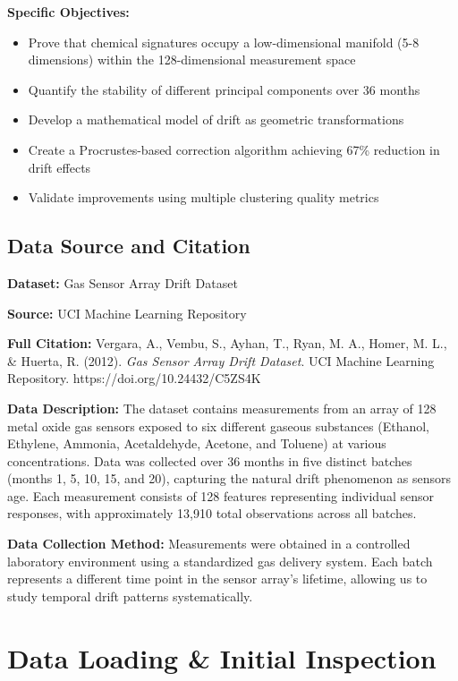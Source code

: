 \documentclass[
  letterpaper,
  DIV=11,
  numbers=noendperiod]{scrartcl}
\providecommand{\tightlist}{%
  \setlength{\itemsep}{0pt}\setlength{\parskip}{0pt}}
\begin{document}
\textbf{Specific Objectives:}

\begin{itemize}
\tightlist
\item
  Prove that chemical signatures occupy a low-dimensional manifold (5-8
  dimensions) within the 128-dimensional measurement space
\item
  Quantify the stability of different principal components over 36
  months
\item
  Develop a mathematical model of drift as geometric transformations
\item
  Create a Procrustes-based correction algorithm achieving 67\%
  reduction in drift effects
\item
  Validate improvements using multiple clustering quality metrics
\end{itemize}

\subsection{Data Source and Citation}\label{data-source-and-citation}

\textbf{Dataset:} Gas Sensor Array Drift Dataset

\textbf{Source:} UCI Machine Learning Repository

\textbf{Full Citation:} Vergara, A., Vembu, S., Ayhan, T., Ryan, M. A.,
Homer, M. L., \& Huerta, R. (2012). \emph{Gas Sensor Array Drift
Dataset}. UCI Machine Learning Repository.
https://doi.org/10.24432/C5ZS4K

\textbf{Data Description:} The dataset contains measurements from an
array of 128 metal oxide gas sensors exposed to six different gaseous
substances (Ethanol, Ethylene, Ammonia, Acetaldehyde, Acetone, and
Toluene) at various concentrations. Data was collected over 36 months in
five distinct batches (months 1, 5, 10, 15, and 20), capturing the
natural drift phenomenon as sensors age. Each measurement consists of
128 features representing individual sensor responses, with
approximately 13,910 total observations across all batches.

\textbf{Data Collection Method:} Measurements were obtained in a
controlled laboratory environment using a standardized gas delivery
system. Each batch represents a different time point in the sensor
array's lifetime, allowing us to study temporal drift patterns
systematically.

\section{Data Loading \& Initial
Inspection}\label{data-loading-initial-inspection}
\end{document}
